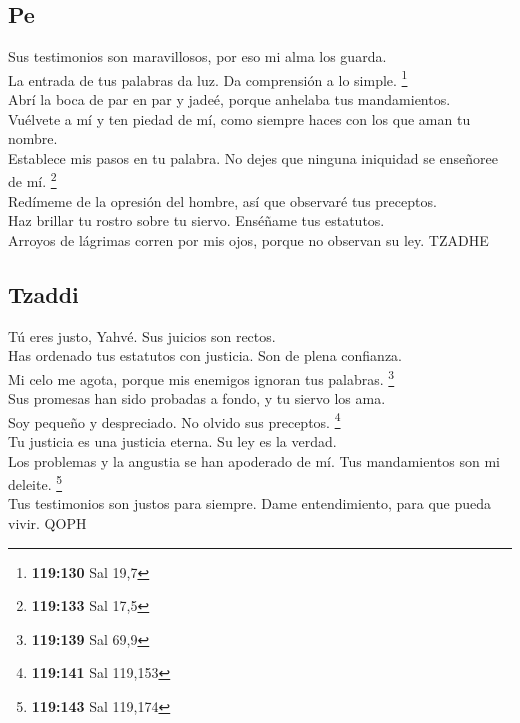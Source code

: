 \hypertarget{pe}{%
\subsection{Pe}\label{pe}}

 Sus testimonios son maravillosos, por eso mi alma los
guarda.\\
 La entrada de tus palabras da luz. Da comprensión a lo
simple. \footnote{\textbf{119:130} Sal 19,7}\\
 Abrí la boca de par en par y jadeé, porque anhelaba tus
mandamientos.\\
 Vuélvete a mí y ten piedad de mí, como siempre haces
con los que aman tu nombre.\\
 Establece mis pasos en tu palabra. No dejes que ninguna
iniquidad se enseñoree de mí. \footnote{\textbf{119:133} Sal 17,5}\\
 Redímeme de la opresión del hombre, así que observaré
tus preceptos.\\
 Haz brillar tu rostro sobre tu siervo. Enséñame tus
estatutos.\\
 Arroyos de lágrimas corren por mis ojos, porque no
observan su ley. TZADHE

\hypertarget{tzaddi}{%
\subsection{Tzaddi}\label{tzaddi}}

 Tú eres justo, Yahvé. Sus juicios son rectos.\\
 Has ordenado tus estatutos con justicia. Son de plena
confianza.\\
 Mi celo me agota, porque mis enemigos ignoran tus
palabras. \footnote{\textbf{119:139} Sal 69,9}\\
 Sus promesas han sido probadas a fondo, y tu siervo los
ama.\\
 Soy pequeño y despreciado. No olvido sus preceptos.
\footnote{\textbf{119:141} Sal 119,153}\\
 Tu justicia es una justicia eterna. Su ley es la
verdad.\\
 Los problemas y la angustia se han apoderado de mí. Tus
mandamientos son mi deleite. \footnote{\textbf{119:143} Sal 119,174}\\
 Tus testimonios son justos para siempre. Dame
entendimiento, para que pueda vivir. QOPH

